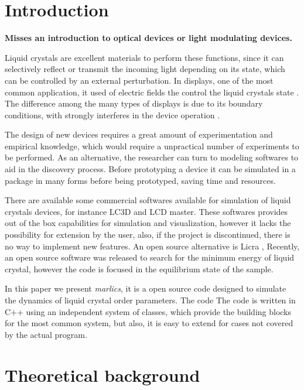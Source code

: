 \documentclass[final,5p,times,twocolumn]{elsarticle}
\begin{document}
\section{Introduction}
\label{Introduction}

\textbf{Misses an introduction to optical devices or light modulating
  devices.}

Liquid crystals are excellent materials to perform these functions,
since it can selectively reflect or transmit the incoming light
depending on its state, which can be controlled by an external
perturbation. In displays, one of the most common application, it used
of electric fields the control the liquid crystals state \cite{}. The
difference among the many types of displays is due to its boundary
conditions, with strongly interferes in the device operation \cite{}.

The design of new devices requires a great amount of experimentation
and empirical knowledge, which would require a unpractical number of
experiments to be performed. As an alternative, the researcher can
turn to modeling softwares to aid in the discovery process. Before
prototyping a device it can be simulated in a package in many forms
before being prototyped, saving time and resources.

There are available some commercial softwares available for simulation
of liquid crystals devices, for instance LC3D\cite{anderson2001lc3d}
and LCD master\cite{LCDMaster}. These softwares provides out of the
box capabilities for simulation and visualization, however it lacks
the possibility for extension by the user, also, if the project is
discontinued, there is no way to implement new features. An open
source alternative is Licra \cite{Licra}, Recently, an open source
software was released to search for the minimum energy of liquid
crystal\cite{Sussman2019}, however the code is focused in the
equilibrium state of the sample.

In this paper we present \textit{marlics}, it is a open source code
designed to simulate the dynamics of liquid crystal order
parameters. The code The code is written in C++ using an independent
system of classes, which provide the building blocks for the most
common system, but also, it is easy to extend for cases not covered by
the actual program.

\section{Theoretical background}
\end{document}
